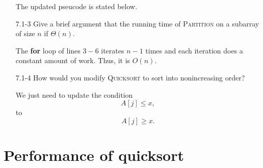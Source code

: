 \begin{enumerate}
\begin{framed}
The updated pseucode is stated below.

\begin{algorithm}[H]
\SetAlgoNoEnd\DontPrintSemicolon
\BlankLine
{}
\nonl{}
\end{algorithm}
\end{framed}

\item[7.1{-}3]{Give a brief argument that the running time of \textsc{Partition}
on a subarray of size $n$ if $\Theta(n)$.}

\begin{framed}
The \textbf{for} loop of lines $3{-}6$ iterates $n - 1$ times and each
iteration does a constant amount of work. Thus, it is $O(n)$.
\end{framed}

\newpage

\item[7.1{-}4]{How would you modify \textsc{Quicksort} to sort into
nonincreasing order?}

\begin{framed}
We just need to update the condition
\[
  A[j] \le x,
\]
to
\[
  A[j] \ge x.
\]
\end{framed}

\end{enumerate}

\newpage

\section{Performance of quicksort}


